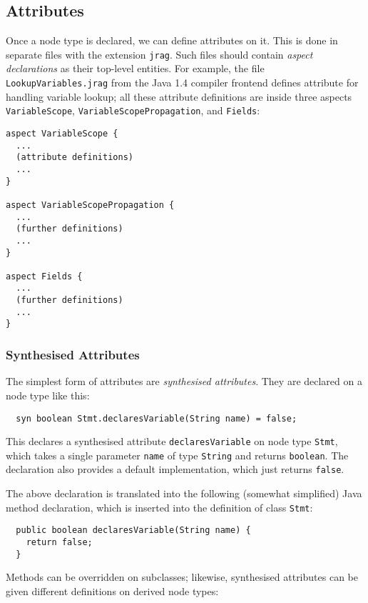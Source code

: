 \documentclass{article}
\newcommand{\file}[1]{\texttt{#1}}
\newcommand{\nt}[1]{\texttt{#1}}
\newcommand{\code}[1]{\lstinline$#1$}
\begin{document}
\subsection{Attributes}
Once a node type is declared, we can define attributes on it. This is done in separate files with the extension \file{jrag}. Such files should contain \emph{aspect declarations} as their top-level entities. For example, the file \file{LookupVariables.jrag} from the Java 1.4 compiler frontend defines attribute for handling variable lookup; all these attribute definitions are inside three aspects \code{VariableScope}, \code{VariableScopePropagation}, and \code{Fields}:

\begin{lstlisting}
aspect VariableScope {
  ...
  (attribute definitions)
  ...
}

aspect VariableScopePropagation {
  ...
  (further definitions)
  ...
}

aspect Fields {
  ...
  (further definitions)
  ...
}
\end{lstlisting}

\subsubsection{Synthesised Attributes}
The simplest form of attributes are \emph{synthesised attributes}. They are declared on a node type like this:

\begin{lstlisting}
  syn boolean Stmt.declaresVariable(String name) = false;
\end{lstlisting}

This declares a synthesised attribute \code{declaresVariable} on node type \nt{Stmt}, which takes a single parameter \code{name} of type \code{String} and returns \code{boolean}. The declaration also provides a default implementation, which just returns \code{false}.

The above declaration is translated into the following (somewhat simplified) Java method declaration, which is inserted into the definition of class \code{Stmt}:

\begin{lstlisting}
  public boolean declaresVariable(String name) {
    return false;
  }
\end{lstlisting}

Methods can be overridden on subclasses; likewise, synthesised attributes can be given different definitions on derived node types:
\end{document}
